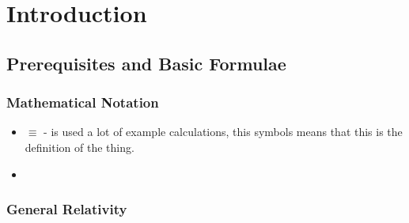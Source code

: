 
\chapter{Introduction}
\section{Prerequisites and Basic Formulae}
\subsection{Mathematical Notation}
\begin{itemize}
    \item $\equiv$ - is used a lot of example calculations, this symbols means that this is the definition of the thing. 
    \item
\end{itemize}

\subsection{General Relativity}

